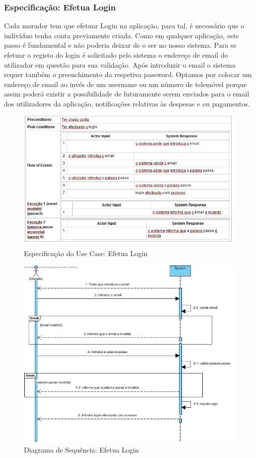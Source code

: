 \newpage \clearpage
\subsubsection{Especificação: Efetua Login }
Cada morador tem que efetuar Login na aplicação, para tal, é necessário que o indivíduo tenha conta previamente criada. Como em qualquer aplicação, este passo é fundamental e não poderia deixar de o ser no nosso sistema. Para se efetuar o registo do login é solicitado pelo sistema o endereço de email do utilizador em questão para sua validação. Após introduzir o email o sistema requer também o preenchimento da respetiva password. Optamos por colocar um endereço de email ao invés de um username ou um número de telemóvel porque assim poderá existir a possibilidade de futuramente serem enviados para o email dos utilizadores da aplicação, notificações relativas às despesas e ou pagamentos.

\begin{figure}[htb!]
	\centering
	\includegraphics[scale=0.5]{imagens/Especificacoes/efetualogin}  
	\caption{Especificação do Use Case: Efetua Login  }  
\end{figure}


\begin{figure}[htb!]
	\centering
	\includegraphics[scale=0.5]{imagens/diagramaSeq/Login}  
	\caption{Diagrama de Sequência: Efetua Login }  
\end{figure}



